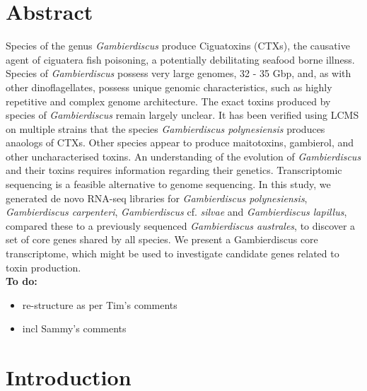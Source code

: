 \documentclass[12pt]{article}
\begin{document}
\section{Abstract}
Species of the genus \textit{Gambierdiscus} produce Ciguatoxins (CTXs), the causative agent of ciguatera fish poisoning, a potentially debilitating seafood borne illness. 
Species of \textit{Gambierdiscus} possess very large genomes, 32 - 35 Gbp, and, as with other dinoflagellates, possess unique genomic characteristics, such as highly repetitive and complex genome architecture. 
The exact toxins produced by species of \textit{Gambierdiscus} remain largely unclear. 
It has been verified using LCMS on multiple strains that the species \textit{Gambierdiscus polynesiensis} produces anaologs of CTXs. 
Other species appear to produce maitotoxins, gambierol, and other uncharacterised toxins. 
An understanding of the evolution of \textit{Gambierdiscus} and their toxins requires information regarding their genetics. 
Transcriptomic sequencing is a feasible alternative to genome sequencing. 
In this study, we generated de novo RNA-seq libraries for \textit{Gambierdiscus polynesiensis}, \textit{Gambierdiscus carpenteri}, \textit{Gambierdiscus} cf. \textit{silvae} and \textit{Gambierdiscus lapillus}, compared these to a previously sequenced \textit{Gambierdiscus australes}, to discover a set of core genes shared by all species. 
We present a Gambierdiscus core transcriptome, which might be used to investigate candidate genes related to toxin production.\\
\textbf{To do:}
\begin{itemize}
\item re-structure as per Tim's comments
\item incl Sammy's comments
\end{itemize}

\newpage
\section{Introduction}
\end{document}

